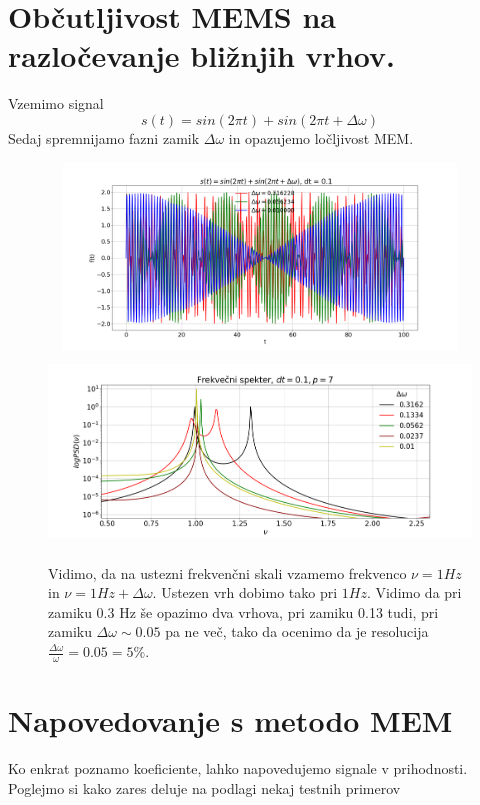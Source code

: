 \documentclass[11pt, a4paper]{article}
\begin{document}
\section{Občutljivost MEMS na  razločevanje bližnjih vrhov. }
Vzemimo signal
\begin{equation}
s(t) = sin(2\pi t) + sin(2\pi t + \Delta \omega)
\end{equation}
Sedaj spremnijamo fazni zamik $\Delta \omega$ in opazujemo ločljivost MEM.

\begin{figure}[H]
\centering
  \includegraphics[width=16cm,height=5cm]{prva_cetrti.png}
  \includegraphics[width=16cm,height=5cm]{prva_cetrti2.png}
\caption{Vidimo, da na ustezni frekvenčni skali vzamemo frekvenco $\nu = 1 Hz$ in $\nu = 1 Hz + \Delta \omega$. Ustezen vrh dobimo tako pri $1 Hz$. Vidimo da pri zamiku 0.3 Hz še opazimo dva vrhova, pri zamiku 0.13 tudi, pri zamiku $\Delta \omega \sim 0.05$ pa ne več, tako da ocenimo da je resolucija $\frac{\Delta \omega }{\omega  } = 0.05 = 5 \% $.}
\end{figure}
\section{Napovedovanje s metodo MEM}
Ko enkrat poznamo koeficiente, lahko napovedujemo signale v prihodnosti. Poglejmo si kako zares deluje na podlagi nekaj testnih primerov
\end{document}
